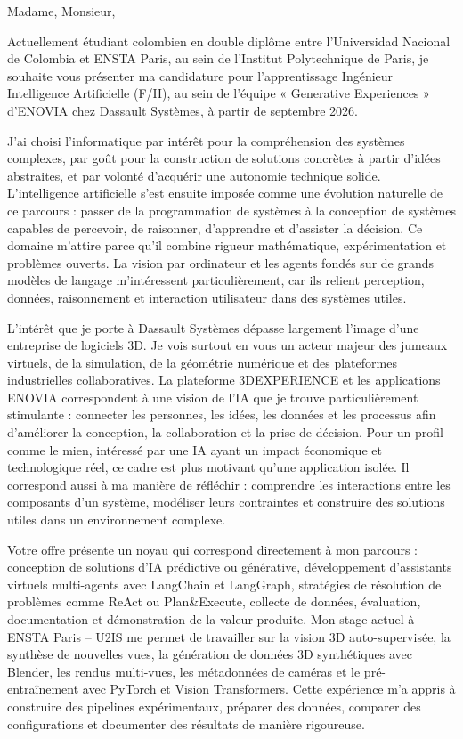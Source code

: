 \documentclass[10pt,a4paper]{article}
\begin{document}
{\small

Madame, Monsieur,

Actuellement étudiant colombien en double diplôme entre l’Universidad Nacional de Colombia et ENSTA Paris, au sein de l’Institut Polytechnique de Paris, je souhaite vous présenter ma candidature pour l’apprentissage Ingénieur Intelligence Artificielle (F/H), au sein de l’équipe « Generative Experiences » d’ENOVIA chez Dassault Systèmes, à partir de septembre 2026.

J’ai choisi l’informatique par intérêt pour la compréhension des systèmes complexes, par goût pour la construction de solutions concrètes à partir d’idées abstraites, et par volonté d’acquérir une autonomie technique solide. L’intelligence artificielle s’est ensuite imposée comme une évolution naturelle de ce parcours : passer de la programmation de systèmes à la conception de systèmes capables de percevoir, de raisonner, d’apprendre et d’assister la décision. Ce domaine m’attire parce qu’il combine rigueur mathématique, expérimentation et problèmes ouverts. La vision par ordinateur et les agents fondés sur de grands modèles de langage m’intéressent particulièrement, car ils relient perception, données, raisonnement et interaction utilisateur dans des systèmes utiles.

L’intérêt que je porte à Dassault Systèmes dépasse largement l’image d’une entreprise de logiciels 3D. Je vois surtout en vous un acteur majeur des jumeaux virtuels, de la simulation, de la géométrie numérique et des plateformes industrielles collaboratives. La plateforme 3DEXPERIENCE et les applications ENOVIA correspondent à une vision de l’IA que je trouve particulièrement stimulante : connecter les personnes, les idées, les données et les processus afin d’améliorer la conception, la collaboration et la prise de décision. Pour un profil comme le mien, intéressé par une IA ayant un impact économique et technologique réel, ce cadre est plus motivant qu’une application isolée. Il correspond aussi à ma manière de réfléchir : comprendre les interactions entre les composants d’un système, modéliser leurs contraintes et construire des solutions utiles dans un environnement complexe.

Votre offre présente un noyau qui correspond directement à mon parcours : conception de solutions d’IA prédictive ou générative, développement d’assistants virtuels multi-agents avec LangChain et LangGraph, stratégies de résolution de problèmes comme ReAct ou Plan&Execute, collecte de données, évaluation, documentation et démonstration de la valeur produite. Mon stage actuel à ENSTA Paris – U2IS me permet de travailler sur la vision 3D auto-supervisée, la synthèse de nouvelles vues, la génération de données 3D synthétiques avec Blender, les rendus multi-vues, les métadonnées de caméras et le pré-entraînement avec PyTorch et Vision Transformers. Cette expérience m’a appris à construire des pipelines expérimentaux, préparer des données, comparer des configurations et documenter des résultats de manière rigoureuse.

}
\end{document}
